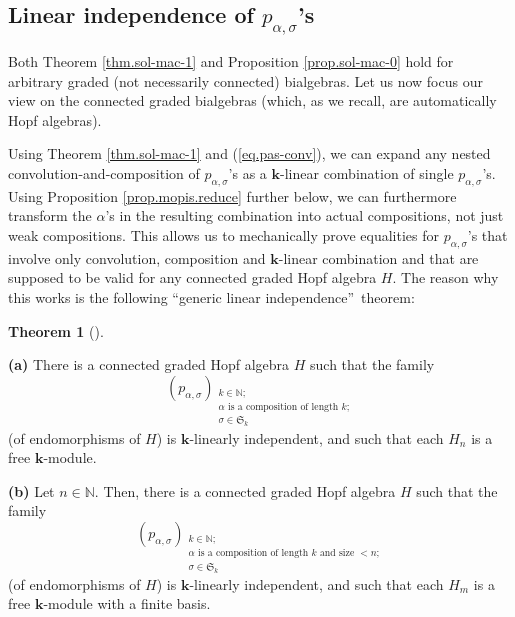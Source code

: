 \documentclass[numbers=enddot,12pt,final,onecolumn,notitlepage]{scrartcl}%
\theoremstyle{definition}
\newtheorem{theo}{Theorem}[section]
\newenvironment{theorem}[1][]
{\begin{theo}[#1]\begin{leftbar}}
{\end{leftbar}\end{theo}}
\begin{document}
\subsection{Linear independence of $p_{\alpha,\sigma}$'s}

Both Theorem \ref{thm.sol-mac-1} and Proposition \ref{prop.sol-mac-0} hold for
arbitrary graded (not necessarily connected) bialgebras. Let us now focus our
view on the connected graded bialgebras (which, as we recall, are
automatically Hopf algebras).

Using Theorem \ref{thm.sol-mac-1} and (\ref{eq.pas-conv}), we can expand any
nested convolution-and-composition of $p_{\alpha,\sigma}$'s as a $\mathbf{k}%
$-linear combination of single $p_{\alpha,\sigma}$'s. Using Proposition
\ref{prop.mopis.reduce} further below, we can furthermore transform the
$\alpha$'s in the resulting combination into actual compositions, not just
weak compositions. This allows us to mechanically prove equalities for
$p_{\alpha,\sigma}$'s that involve only convolution, composition and
$\mathbf{k}$-linear combination and that are supposed to be valid for any
connected graded Hopf algebra $H$. The reason why this works is the following
\textquotedblleft generic linear independence\textquotedblright\ theorem:

\begin{theorem}
\label{thm.pas-lin-ind}\textbf{(a)} There is a connected graded Hopf algebra
$H$ such that the family%
\[
\left(  p_{\alpha,\sigma}\right)  _{\substack{k\in\mathbb{N}\text{;}%
\\\alpha\text{ is a composition of length }k\text{;}\\\sigma\in\mathfrak{S}%
_{k}}}
\]
(of endomorphisms of $H$) is $\mathbf{k}$-linearly independent, and such that
each $H_{n}$ is a free $\mathbf{k}$-module. \medskip

\textbf{(b)} Let $n\in\mathbb{N}$. Then, there is a connected graded Hopf
algebra $H$ such that the family%
\[
\left(  p_{\alpha,\sigma}\right)  _{\substack{k\in\mathbb{N}\text{;}%
\\\alpha\text{ is a composition of length }k\text{ and size }<n\text{;}%
\\\sigma\in\mathfrak{S}_{k}}}
\]
(of endomorphisms of $H$) is $\mathbf{k}$-linearly independent, and such that
each $H_{m}$ is a free $\mathbf{k}$-module with a finite basis.
\end{theorem}
\end{document}

